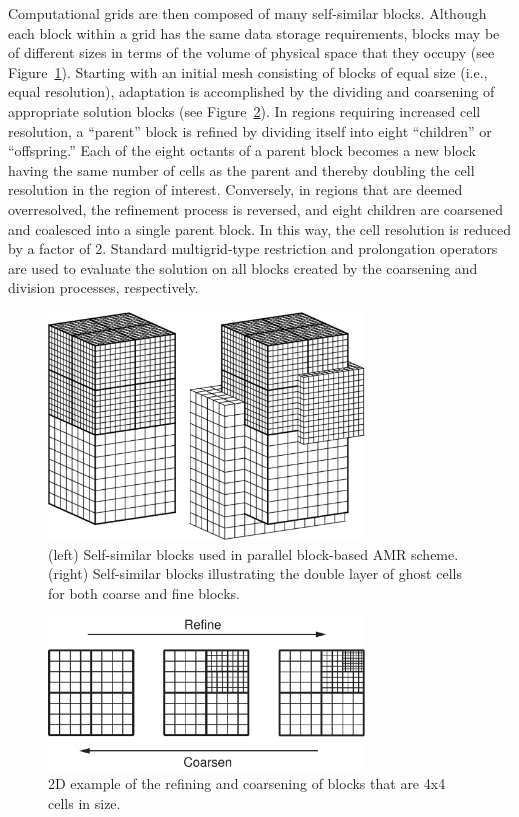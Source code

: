 Computational grids are then composed of many self-similar blocks. Although
each block within a grid has the same data storage requirements, blocks may be
of different sizes in terms of the volume of physical space that they
occupy (see Figure~\ref{fig:blocks}).
Starting with an initial mesh consisting of blocks of equal size (i.e., equal
resolution), adaptation is accomplished by the dividing and coarsening of
appropriate solution blocks (see Figure~\ref{fig:refine_coarsen}).  In regions
requiring 
increased cell resolution, a
``parent'' block is refined by dividing itself into eight ``children'' or
``offspring.''  Each of the eight octants of a parent block becomes a new block
having the same number of cells as the parent and thereby doubling the cell
resolution in the region of interest. Conversely, in regions that are deemed
overresolved, the refinement process is reversed, and eight children are
coarsened and coalesced into a single parent block.  In this way, the cell
resolution is reduced by a factor of 2. Standard multigrid-type restriction
and prolongation operators are used to evaluate the solution on all blocks
created by the coarsening and division processes, respectively.
\begin{figure}
\begin{center}
\includegraphics*[width=8.4cm]{adaptiveblock.pdf}
\end{center}
\caption{(left) Self-similar blocks used in parallel block-based AMR
           scheme. (right) Self-similar blocks illustrating the double
           layer of ghost cells for both coarse and fine blocks.}
\label{fig:blocks}
\end{figure}
\begin{figure}
\begin{center}
\includegraphics*[width=8.4cm]{adapted_grid.pdf}
\end{center}
\caption{2D example of the refining and coarsening of blocks that are
4x4 cells in size.}
\label{fig:refine_coarsen}
\end{figure}

